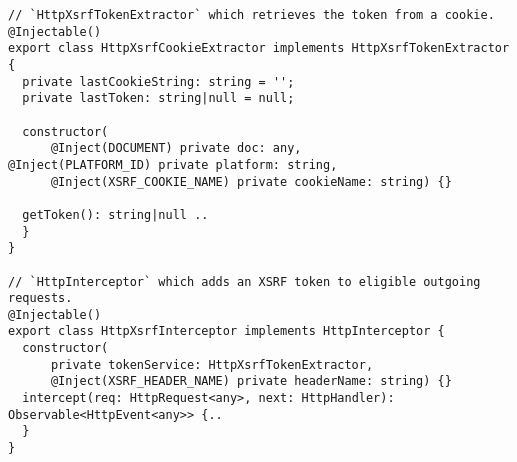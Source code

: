 \begin{verbatim}
// `HttpXsrfTokenExtractor` which retrieves the token from a cookie.
@Injectable()
export class HttpXsrfCookieExtractor implements HttpXsrfTokenExtractor {
  private lastCookieString: string = '';
  private lastToken: string|null = null;

  constructor(
      @Inject(DOCUMENT) private doc: any,
@Inject(PLATFORM_ID) private platform: string,
      @Inject(XSRF_COOKIE_NAME) private cookieName: string) {}

  getToken(): string|null ..
  }
}

// `HttpInterceptor` which adds an XSRF token to eligible outgoing requests.
@Injectable()
export class HttpXsrfInterceptor implements HttpInterceptor {
  constructor(
      private tokenService: HttpXsrfTokenExtractor,
      @Inject(XSRF_HEADER_NAME) private headerName: string) {}
  intercept(req: HttpRequest<any>, next: HttpHandler):
Observable<HttpEvent<any>> {..
  }
}
\end{verbatim}
